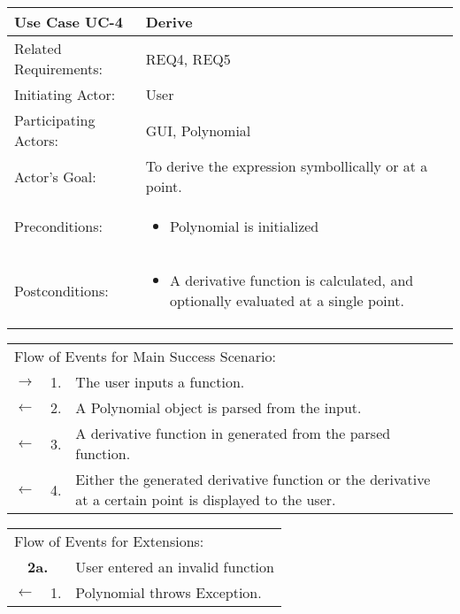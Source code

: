 \documentclass[11pt,letterpaper]{article}
\begin{document}
\newpage

\begin{center}
\begin{tabular}{p{1.5in}p{5in}}
\hline
\textbf{Use Case UC-4}     & \textbf{Derive} \\ \hline
Related Requirements: & REQ4, REQ5 \\
Initiating Actor:     & User \\
Participating Actors: & GUI, Polynomial \\
Actor's Goal:          & To derive the expression symbollically or at a point. \\
Preconditions:         & \begin{itemize}[nosep]
		      \item  Polynomial is initialized
                         \end{itemize} \\
Postconditions:        & \begin{itemize}[nosep]
                         \item A derivative function is calculated, and optionally evaluated at a single point.
                         \end{itemize} \\ \hline
\end{tabular}

\begin{tabular}{p{.25in}p{.25in}p{5.8in}}
\multicolumn{3}{l}{Flow of Events for Main Success Scenario:} \\
$\rightarrow$ & 1. & The user inputs a function.\\
$\leftarrow$   & 2. & A Polynomial object is parsed from the input.\\
$\leftarrow$   & 3. & A derivative function in generated from the parsed function.\\
$\leftarrow$   & 4. & Either the generated derivative function or the derivative at a certain point is displayed to the user.\\ 
\end{tabular}

\begin{tabular}{p{.25in}p{.25in}p{5.8in}}
\multicolumn{3}{l}{Flow of Events for Extensions:} \\
\multicolumn{2}{c}{\textbf{2a.}} & User entered an invalid function \\
$\leftarrow$  & 1.           & Polynomial throws Exception.\\
\end{tabular}
\end{center}
\end{document}
